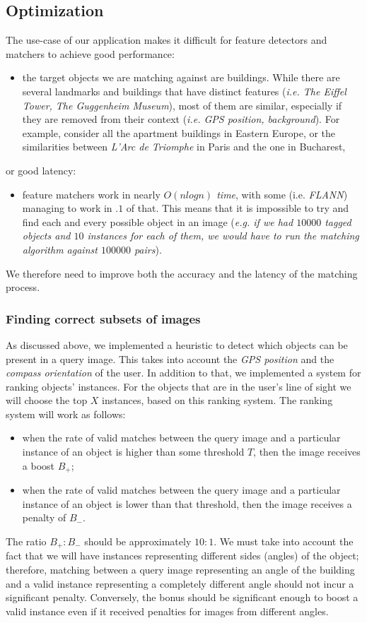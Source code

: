 \documentclass[a4paper,onecolumn,oneside,titlepage,11pt]{report}
\begin{document}
\subsection{Optimization}
The use-case of our application makes it difficult for feature detectors and matchers to achieve good performance:
\begin{itemize}
	\item the target objects we are matching against are buildings. While there are several landmarks and buildings that have distinct features (\emph{i.e. The Eiffel Tower, The Guggenheim Museum}), most of them are similar, especially if they are removed from their context (\emph{i.e. GPS position, background}). For example, consider all the apartment buildings in Eastern Europe, or the similarities between \emph{L'Arc de Triomphe} in Paris and the one in Bucharest,
\end{itemize}
or good latency:
\begin{itemize}
	\item feature matchers work in nearly \emph{$O(nlogn)$ time}, with some (i.e. \emph{FLANN}) managing to work in $.1$ of that. This means that it is impossible to try and find each and every possible object in an image (\emph{e.g. if we had $10000$ tagged objects and $10$ instances for each of them, we would have to run the matching algorithm against $100000$ pairs}).
\end{itemize}
We therefore need to improve both the accuracy and the latency of the matching process.

\subsubsection{Finding correct subsets of images}
As discussed above, we implemented a heuristic to detect which objects can be present in a query image. This takes into account the \emph{GPS position} and the \emph{compass orientation} of the user.
In addition to that, we implemented a system for ranking objects' instances. For the objects that are in the user's line of sight we will choose the top $X$ instances, based on this ranking system.
The ranking system will work as follows:
\begin{itemize}
	\item when the rate of valid matches between the query image and a particular instance of an object is higher than some threshold $T$, then the image receives a boost $B_+$;
	\item when the rate of valid matches between the query image and a particular instance of an object is lower than that threshold, then the image receives a penalty of $B_-$.
\end{itemize}
The ratio $B_+ : B_-$ should be approximately $10 : 1$. We must take into account the fact that we will have instances representing different sides (angles) of the object; therefore, matching between a query image representing an angle of the building and a valid instance representing a completely different angle should not incur a significant penalty. Conversely, the bonus should be significant enough to boost a valid instance even if it received penalties for images from different angles.
\end{document}
